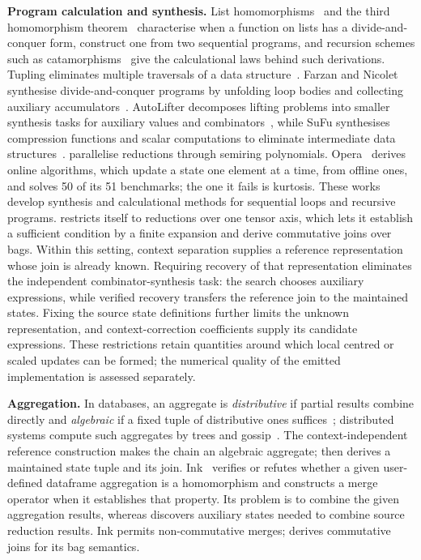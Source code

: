 \textbf{Program calculation and synthesis.}
List homomorphisms~\citep{bird87} and the third homomorphism theorem~\citep{gibbons96} characterise when a function on lists has a divide-and-conquer form, \citet{morita07} construct one from two sequential programs, and recursion schemes such as catamorphisms~\citep{meijer91} give the calculational laws behind such derivations.
Tupling eliminates multiple traversals of a data structure~\citep{bird84,pettorossi87,hu96,hu97}.
Farzan and Nicolet synthesise divide-and-conquer programs by unfolding loop bodies and collecting auxiliary accumulators~\citep{farzan17,farzan19,farzan21}.
AutoLifter decomposes lifting problems into smaller synthesis tasks for auxiliary values and combinators~\citep{autolifter}, while SuFu synthesises compression functions and scalar computations to eliminate intermediate data structures~\citep{sufu}.
\citet{morihata21} parallelise reductions through semiring polynomials.
Opera~\citep{opera} derives online algorithms, which update a state one element at a time, from offline ones, and solves 50 of its 51 benchmarks; the one it fails is kurtosis.
These works develop synthesis and calculational methods for sequential loops and recursive programs.
\sys restricts itself to reductions over one tensor axis, which lets it establish a sufficient condition by a finite expansion and derive commutative joins over bags.
Within this setting, context separation supplies a reference representation whose join is already known.
Requiring recovery of that representation eliminates the independent combinator-synthesis task: the search chooses auxiliary expressions, while verified recovery transfers the reference join to the maintained states.
Fixing the source state definitions further limits the unknown representation, and context-correction coefficients supply its candidate expressions.
These restrictions retain quantities around which local centred or scaled updates can be formed; the numerical quality of the emitted implementation is assessed separately.

\textbf{Aggregation.}
In databases, an aggregate is \emph{distributive} if partial results combine directly and \emph{algebraic} if a fixed tuple of distributive ones suffices~\citep{datacube}; distributed systems compute such aggregates by trees and gossip~\citep{jesus}.
The context-independent reference construction makes the chain an algebraic aggregate; \sys then derives a maintained state tuple and its join.
Ink~\citep{ink} verifies or refutes whether a given user-defined dataframe aggregation is a homomorphism and constructs a merge operator when it establishes that property.
Its problem is to combine the given aggregation results, whereas \sys discovers auxiliary states needed to combine source reduction results.
Ink permits non-commutative merges; \sys derives commutative joins for its bag semantics.

